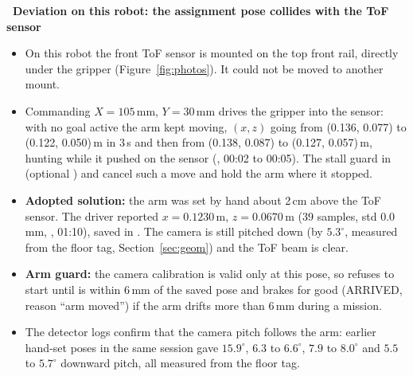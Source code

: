 \begin{warnbox}
\small\textbf{\color{warn}\faExclamationTriangle\ Deviation on this robot: the assignment pose collides with the ToF sensor}
\begin{itemize}
  \item On this robot the front ToF sensor is mounted on the top front rail, directly under the gripper
        (Figure~\ref{fig:photos}). It could not be moved to another mount.
  \item Commanding $X=105$\,mm, $Y=30$\,mm drives the gripper into the sensor: with no goal active the arm kept moving,
         $(x,z)$ going from (0.136, 0.077) to (0.122, 0.050)\,m in 3\,s and then from (0.138, 0.087) to
        (0.127, 0.057)\,m, hunting while it pushed on the sensor (, 00:02 to 00:05). The stall guard in  (optional ) and
         cancel such a move and hold the arm where it stopped.
  \item \textbf{Adopted solution:} the arm was set by hand about 2\,cm above the ToF sensor. The driver reported
         $x=0.1230$\,m, $z=0.0670$\,m (39 samples, std 0.0\,mm, , 01:10),
        saved in . The camera is still pitched
        down (by $5.3^\circ$, measured from the floor tag, Section~\ref{sec:geom}) and the ToF beam is clear.
  \item \textbf{Arm guard:} the camera calibration is valid only at this pose, so  refuses to
        start until  is within 6\,mm of the saved pose and brakes for good (ARRIVED, reason
        ``arm moved'') if the arm drifts more than 6\,mm during a mission.
  \item The detector logs confirm that the camera pitch follows the arm: earlier hand-set poses in the same session gave
        $15.9^\circ$, $6.3$ to $6.6^\circ$, $7.9$ to $8.0^\circ$ and $5.5$ to $5.7^\circ$ downward pitch, all measured from the
        floor tag.
\end{itemize}
\end{warnbox}


